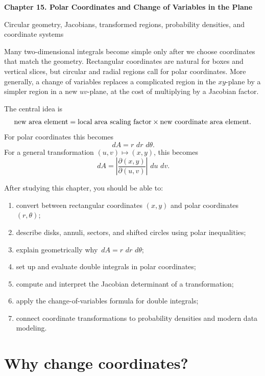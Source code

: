 \documentclass[11pt]{article}
\newcommand{\dd}{\,d}
\begin{document}
\begin{center}
  {\LARGE\bfseries Chapter 15. Polar Coordinates and Change of Variables in the Plane\par}
  \vspace{0.35em}
  {\large Circular geometry, Jacobians, transformed regions, probability densities, and coordinate systems\par}
\end{center}

\begin{chapteroverviewbox}
Many two-dimensional integrals become simple only after we choose coordinates that match the geometry. Rectangular coordinates are natural for boxes and vertical slices, but circular and radial regions call for polar coordinates. More generally, a change of variables replaces a complicated region in the $xy$-plane by a simpler region in a new $uv$-plane, at the cost of multiplying by a Jacobian factor.

The central idea is
\[
\hbox{new area element}=\hbox{local area scaling factor}\times \hbox{new coordinate area element}.
\]
For polar coordinates this becomes
\[
\dd A=r\,\dd r\,\dd\theta.
\]
For a general transformation $(u,v)\mapsto (x,y)$, this becomes
\[
\dd A=\left|\frac{\partial(x,y)}{\partial(u,v)}\right|\,\dd u\,\dd v.
\]
\end{chapteroverviewbox}

\begin{goalbox}
After studying this chapter, you should be able to:
\begin{enumerate}
  \item convert between rectangular coordinates $(x,y)$ and polar coordinates $(r,\theta)$;
  \item describe disks, annuli, sectors, and shifted circles using polar inequalities;
  \item explain geometrically why $\dd A=r\,\dd r\,\dd\theta$;
  \item set up and evaluate double integrals in polar coordinates;
  \item compute and interpret the Jacobian determinant of a transformation;
  \item apply the change-of-variables formula for double integrals;
  \item connect coordinate transformations to probability densities and modern data modeling.
\end{enumerate}
\end{goalbox}

\section{Why change coordinates?}
\end{document}
